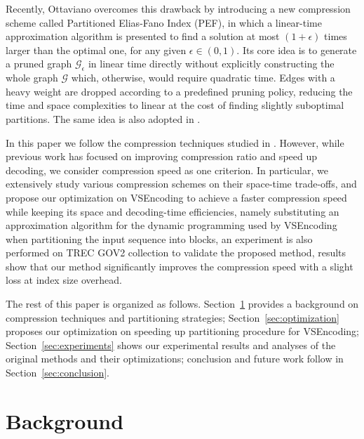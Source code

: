 \documentclass[runningheads,a4paper]{llncs}
\begin{document}
Recently, Ottaviano overcomes this drawback by introducing a new compression scheme called Partitioned Elias-Fano Index (PEF)\cite{ottaviano2014partitioned}, in which a linear-time approximation algorithm is presented to find a solution at most $\left(1+\epsilon\right)$ times larger than the optimal one, for any given $\epsilon\in\left(0,1\right)$. Its core idea is to generate a pruned graph $\mathcal{G}_{\epsilon}$ in linear time directly without explicitly constructing the whole graph $\mathcal{G}$ which, otherwise, would require quadratic time. Edges with a heavy weight are dropped according to a predefined pruning policy, reducing the time and space complexities to linear at the cost of finding slightly suboptimal partitions. The same idea is also adopted in \cite{ferragina2011optimally}.

In this paper we follow the compression techniques studied in \cite{catena2014inverted,lemire2015decoding,trotman2014compression,yan2009inverted}. However, while previous work has focused on improving compression ratio and speed up decoding, we consider compression speed as one criterion. In particular, we extensively study various compression schemes on their space-time trade-offs, and propose our optimization on VSEncoding to achieve a faster compression speed while keeping its space and decoding-time efficiencies, namely substituting an approximation algorithm for the dynamic programming used by VSEncoding\cite{silvestri2010vsencoding} when partitioning the input sequence into blocks, an experiment is also performed on TREC GOV2 collection to validate the proposed method, results show that our method significantly improves the compression speed with a slight loss at index size overhead.

The rest of this paper is organized as follows. Section~\ref{sec:background} provides a background on compression techniques and partitioning strategies; Section~\ref{sec:optimization} proposes our optimization on speeding up partitioning procedure for VSEncoding; Section~\ref{sec:experiments} shows our experimental results and analyses of the original methods and their optimizations; conclusion and future work follow in Section~\ref{sec:conclusion}.

\section{Background}\label{sec:background}
\end{document}
